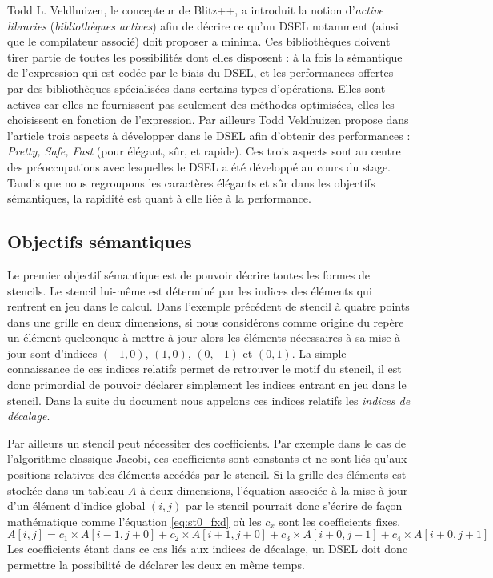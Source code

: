 Todd L. Veldhuizen, le concepteur de \textsf{Blitz++}, a introduit la notion d'\emph{active libraries} (\emph{bibliothèques actives}) \cite{Art20} afin de décrire ce qu'un DSEL notamment (ainsi que le compilateur associé) doit proposer a minima. Ces bibliothèques doivent tirer partie de toutes les possibilités dont elles disposent : à la fois la sémantique de l'expression qui est codée par le biais du DSEL, et les performances offertes par des bibliothèques spécialisées dans certains types d'opérations. Elles sont actives car elles ne fournissent pas seulement des méthodes optimisées, elles les choisissent en fonction de l'expression. Par ailleurs Todd Veldhuizen propose dans l'article \cite{Art22} trois aspects à développer dans le DSEL afin d'obtenir des performances : \emph{Pretty, Safe, Fast} (pour élégant, sûr, et rapide). Ces trois aspects sont au centre des préoccupations avec lesquelles le DSEL a été développé au cours du stage. Tandis que nous regroupons les caractères élégants et sûr dans les objectifs sémantiques, la rapidité est quant à elle liée à la performance.

\subsection{Objectifs sémantiques}
\label{sec:obj_sem}

Le premier objectif sémantique est de pouvoir décrire toutes les formes de stencils. Le stencil lui-même est déterminé par les indices des éléments qui rentrent en jeu dans le calcul. Dans l'exemple précédent de stencil à quatre points dans une grille en deux dimensions, si nous considérons comme origine du repère un élément quelconque à mettre à jour alors les éléments nécessaires à sa mise à jour sont d'indices $(-1,0)$, $(1,0)$, $(0,-1)$ et $(0,1)$. La simple connaissance de ces indices relatifs permet de retrouver le motif du stencil, il est donc primordial de pouvoir déclarer simplement les indices entrant en jeu dans le stencil. Dans la suite du document nous appelons ces indices relatifs les \emph{indices de décalage}.

Par ailleurs un stencil peut nécessiter des coefficients. Par exemple dans le cas de l'algorithme classique Jacobi, ces coefficients sont constants et ne sont liés qu'aux positions relatives des éléments accédés par le stencil. Si la grille des éléments est stockée dans un tableau $A$ à deux dimensions, l'équation associée à la mise à jour d'un élément d'indice global $(i,j)$ par le stencil pourrait donc s'écrire de façon mathématique comme l'équation \ref{eq:st0_fxd} où les $c_x$ sont les coefficients fixes.
\begin{equation}
\label{eq:st0_fxd}
A[i,j] = c_1 \times A[i-1,j+0] + c_2 \times A[i+1,j+0] + c_3 \times A[i+0,j-1] + c_4 \times A[i+0,j+1]
\end{equation}
Les coefficients étant dans ce cas liés aux indices de décalage, un DSEL doit donc permettre la possibilité de déclarer les deux en même temps.

